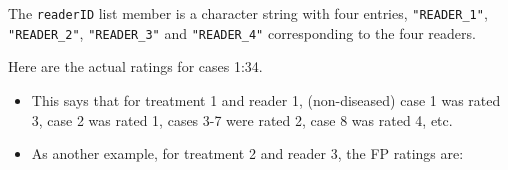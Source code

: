 \documentclass[
]{book}
\newenvironment{Shaded}{\begin{snugshade}}{\end{snugshade}}
\newcommand{\CommentTok}[1]{\textcolor[rgb]{0.56,0.35,0.01}{\textit{#1}}}
\newcommand{\DecValTok}[1]{\textcolor[rgb]{0.00,0.00,0.81}{#1}}
\newcommand{\NormalTok}[1]{#1}
\newcommand{\OperatorTok}[1]{\textcolor[rgb]{0.81,0.36,0.00}{\textbf{#1}}}
\begin{document}
\begin{Shaded}
\end{Shaded}

The \texttt{readerID} list member is a character string with four entries, \texttt{"READER\_1"}, \texttt{"READER\_2"}, \texttt{"READER\_3"} and \texttt{"READER\_4"} corresponding to the four readers.

\begin{Shaded}
\end{Shaded}

Here are the actual ratings for cases 1:34.

\begin{Shaded}
\end{Shaded}

\begin{itemize}
\item
  This says that for treatment 1 and reader 1, (non-diseased) case 1 was rated 3, case 2 was rated 1, cases 3-7 were rated 2, case 8 was rated 4, etc.
\item
  As another example, for treatment 2 and reader 3, the FP ratings are:
\end{itemize}

\begin{Shaded}
\end{Shaded}
\end{document}

